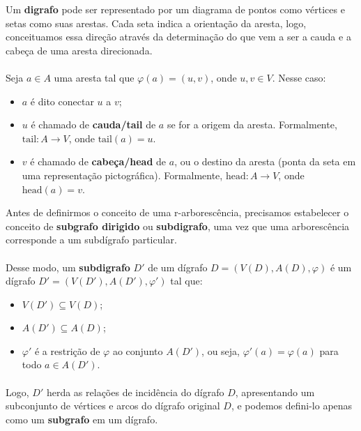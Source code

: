 \documentclass[12pt,a4paper]{article}
\begin{document}
Um \textbf{digrafo} pode ser representado por um diagrama de pontos como vértices e setas como suas arestas. Cada seta indica a orientação da aresta, logo, conceituamos essa direção através da determinação do que vem a ser a cauda e a cabeça de uma aresta direcionada.

\paragraph{}
Seja \(a \in A\) uma aresta tal que \(\varphi(a) = (u, v)\), onde \(u, v \in V\). Nesse caso:
\begin{itemize}
    \item \(a\) é dito conectar \(u\) a \(v\);
    \item \(u\) é chamado de \textbf{cauda/tail} de \(a\) se for a origem da aresta. Formalmente, \(\text{tail}: A \to V\), onde \(\text{tail}(a) = u\).
    \item \(v\) é chamado de \textbf{cabeça/head} de \(a\), ou o destino da aresta (ponta da seta em uma representação pictográfica). Formalmente, \(\text{head}: A \to V\), onde \(\text{head}(a) = v\).
\end{itemize}

Antes de definirmos o conceito de uma r-arborescência, precisamos estabelecer o conceito de \textbf{subgrafo dirigido} ou \textbf{subdigrafo}, uma vez que uma arborescência corresponde a um subdígrafo particular.

\paragraph{}
Desse modo, um \textbf{subdigrafo} \(D'\) de um dígrafo \(D = (V(D), A(D), \varphi)\) é um dígrafo \(D' = (V(D'), A(D'), \varphi')\) tal que:
\begin{itemize}
    \item \(V(D') \subseteq V(D)\);
    \item \(A(D') \subseteq A(D)\);
    \item \(\varphi'\) é a restrição de \(\varphi\) ao conjunto \(A(D')\), ou seja, \(\varphi'(a) = \varphi(a)\) para todo \(a \in A(D')\).
\end{itemize}

\paragraph{}
Logo, \(D'\) herda as relações de incidência do dígrafo \(D\), apresentando um subconjunto de vértices e arcos do dígrafo original \(D\), e podemos defini-lo apenas como um \textbf{subgrafo} em um dígrafo.
\end{document}

